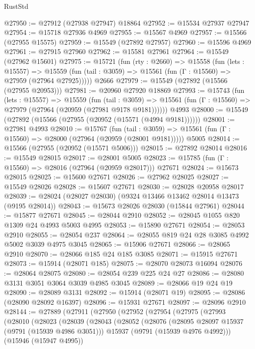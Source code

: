 \begin{lexlean}{RustStd}
\begin{coremodule}
@27950 := @27912 (@27938 @27947) @18864
@27952 := @15534 @27937 @27947
@27954 := @15718 @27936 @4969
@27955 := @15567 @4969
@27957 := @15566 (@27955 @15575)
@27959 := @15549 (@27892 @27957)
@27960 := @15596 @4969
@27961 := @27915 @27960
@27962 := @15581 @27961
@27964 := @15549 (@27962 @15601)
@27975 := @15721
    (fun (rty : @2660) =>
    @15558
      (fun (lets : @15557) =>
      @15559 (fun (tail : @3059) => @15561 (fun (Γ : @15560) => @27959 (@27964 @27925)))))
    @2666
@27979 := @15549 (@27892 (@15566 (@27955 @20953)))
@27981 := @20960 @27920 @18869
@27993 := @15743
    (fun (lets : @15557) =>
    @15559
      (fun (tail : @3059) =>
      @15561 (fun (Γ : @15560) => @27979 (@27964 (@20959 (@27981 @9178 @9181))))))
    @4993
@28000 := @15549 (@27892 (@15566 (@27955 (@20952 (@15571 (@4994 @9181))))))
@28001 := @27981 @4993
@28010 := @15767
    (fun (tail : @3059) => @15561 (fun (Γ : @15560) => @28000 (@27964 (@20959 (@28001 @9181)))))
    @5005
@28014 := @15566 (@27955 (@20952 (@15571 @5006)))
@28015 := @27892 @28014
@28016 := @15549 @28015
@28017 := @28001 @5005
@28023 := @15785 (fun (Γ : @15560) => @28016 (@27964 (@20959 @28017))) @27671
@28024 := @15673 @28015
@28025 := @15600 @27671
@28026 := @27962 @28025
@28027 := @15549 @28026
@28028 := @15607 @27671
@28030 := @28028 @20958 @28017
@28039 := @28024 (@28027 @28030) (@9324 @13466 @13462 @28014 @13473 (@9195 @28014))
@28043 := @15673 @28026 @28030 (@15844 @27961)
@28044 := @15877 @27671
@28045 := @28044 @2910
@28052 := @28045 @1055 @820 @1309 @24 @4993 @5003 @4995
@28053 := @15890 @27671
@28054 := @28053 @2910
@28055 := @28054 @237
@28064 := @28055 @819 @24 @28 @3085 @4992 @5002 @3039 @4975 @3045
@28065 := @15906 @27671
@28066 := @28065 @2910
@28070 := @28066 @185 @24 @185 @3085
@28071 := @15915 @27671
@28073 := @15914 (@28071 @185)
@28075 := @28070 @28073 @16094
@28076 := @28064 @28075
@28080 := @28054 @239 @225 @24 @27
@28086 := @28080 @3131 @3051 @3064 @3039 @4985 @3045
@28089 := @28066 @19 @24 @19
@28090 := @28089 @3131
@28092 := @15914 (@28071 @19)
@28095 := @28086 (@28090 @28092 @16397)
@28096 := @15931 @27671
@28097 := @28096 @2910
@28144 := @27889
    (@27911
      (@27950
        (@27952
          (@27954
            (@27975
              (@27993
                (@28010
                  (@28023
                    (@28039
                      (@28043
                        (@28052
                          (@28076
                            (@28095 @28097 @15937 (@9791 (@15939 @4986 @3051)))
                            @15937
                            (@9791 (@15939 @4976 @4992)))
                          (@15946 (@15947 @4995))

\end{coremodule}
\end{lexlean}
